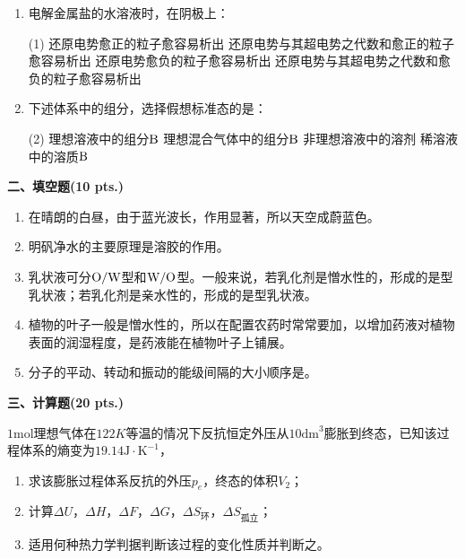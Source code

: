 \begin{enumerate}[label=\arabic*., itemsep=1.5ex]
    \item 电解金属盐的水溶液时，在阴极上：
    \begin{tasks}(1)
        \task 还原电势愈正的粒子愈容易析出
        \task 还原电势与其超电势之代数和愈正的粒子愈容易析出
        \task 还原电势愈负的粒子愈容易析出
        \task 还原电势与其超电势之代数和愈负的粒子愈容易析出
    \end{tasks}
    \item 下述体系中的组分，选择假想标准态的是：
    \begin{tasks}(2)
        \task 理想溶液中的组分$\ce{B}$
        \task 理想混合气体中的组分$\ce{B}$
        \task 非理想溶液中的溶剂
        \task 稀溶液中的溶质$\ce{B}$
    \end{tasks}
\end{enumerate}

\vspace{0.5cm}
\noindent\textbf{二、填空题(10 pts.)}

\begin{enumerate}[label=\arabic*., itemsep=1.5ex]
    \item 在晴朗的白昼，由于蓝光波长\underline{\hspace{2cm}}，\underline{\hspace{2cm}}作用显著，所以天空成蔚蓝色。
    \item 明矾净水的主要原理是溶胶的\underline{\hspace{2cm}}作用。
    \item 乳状液可分$\ce{O/W}$型和$\ce{W/O}$型。一般来说，若乳化剂是憎水性的，形成的是\underline{\hspace{1cm}}型乳状液；若乳化剂是亲水性的，形成的是\underline{\hspace{1cm}}型乳状液。
    \item 植物的叶子一般是憎水性的，所以在配置农药时常常要加\underline{\hspace{2cm}}，以增加药液对植物表面的润湿程度，是药液能在植物叶子上铺展。
    \item 分子的平动、转动和振动的能级间隔的大小顺序是\underline{\hspace{4cm}}。
\end{enumerate}

\vspace{0.5cm}
\noindent\textbf{三、计算题(20 pts.)}

$1\mathrm{mol}$理想气体在$122K$等温的情况下反抗恒定外压从$10\mathrm{dm}^3$膨胀到终态，已知该过程体系的熵变为$19.14\mathrm{J\cdot K^{-1}}$，
\begin{enumerate}[label=(\arabic*), itemsep=1ex]
    \item 求该膨胀过程体系反抗的外压$p_e$，终态的体积$V_2$；
    \item 计算$\Delta U$，$\Delta H$，$\Delta F$，$\Delta G$，$\Delta S_{\text{环}}$，$\Delta S_{\text{孤立}}$；
    \item 适用何种热力学判据判断该过程的变化性质并判断之。
\end{enumerate}

